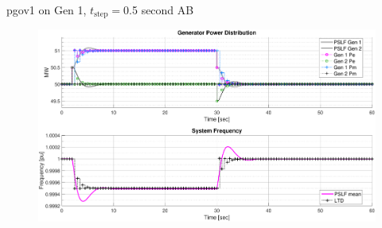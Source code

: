 \documentclass[14pt, unknownkeysallowed]{beamer}
\begin{document}
\begin{frame}
pgov1 on Gen 1, $t_\text{step}=$0.5 second AB
\begin{figure}
	\includegraphics[width=\linewidth]{pgov1TestCab}
\end{figure}
\end{frame}
\end{document}
